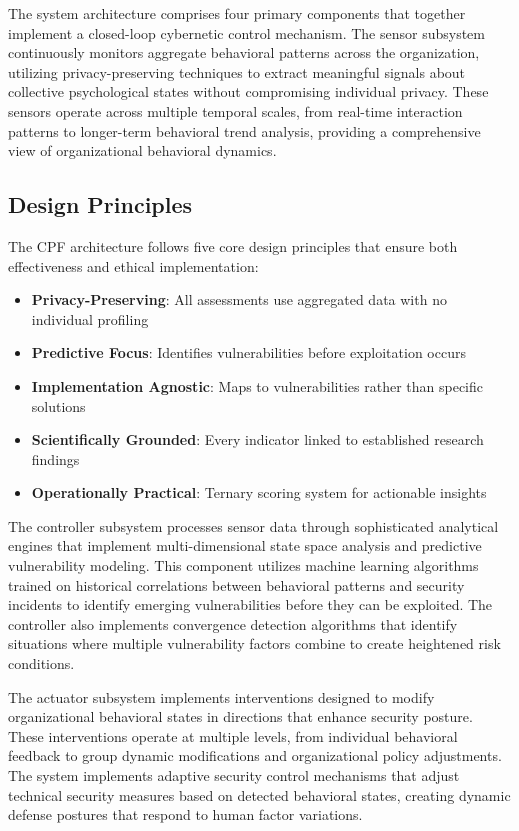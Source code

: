 \documentclass[journal]{IEEEtran}
\begin{document}
The system architecture comprises four primary components that together implement a closed-loop cybernetic control mechanism. The sensor subsystem continuously monitors aggregate behavioral patterns across the organization, utilizing privacy-preserving techniques to extract meaningful signals about collective psychological states without compromising individual privacy. These sensors operate across multiple temporal scales, from real-time interaction patterns to longer-term behavioral trend analysis, providing a comprehensive view of organizational behavioral dynamics.

\subsection{Design Principles}

The CPF architecture follows five core design principles that ensure both effectiveness and ethical implementation:

\begin{itemize}
\item \textbf{Privacy-Preserving}: All assessments use aggregated data with no individual profiling
\item \textbf{Predictive Focus}: Identifies vulnerabilities before exploitation occurs  
\item \textbf{Implementation Agnostic}: Maps to vulnerabilities rather than specific solutions
\item \textbf{Scientifically Grounded}: Every indicator linked to established research findings
\item \textbf{Operationally Practical}: Ternary scoring system for actionable insights
\end{itemize}

The controller subsystem processes sensor data through sophisticated analytical engines that implement multi-dimensional state space analysis and predictive vulnerability modeling. This component utilizes machine learning algorithms trained on historical correlations between behavioral patterns and security incidents to identify emerging vulnerabilities before they can be exploited. The controller also implements convergence detection algorithms that identify situations where multiple vulnerability factors combine to create heightened risk conditions.

The actuator subsystem implements interventions designed to modify organizational behavioral states in directions that enhance security posture. These interventions operate at multiple levels, from individual behavioral feedback to group dynamic modifications and organizational policy adjustments. The system implements adaptive security control mechanisms that adjust technical security measures based on detected behavioral states, creating dynamic defense postures that respond to human factor variations.
\end{document}
